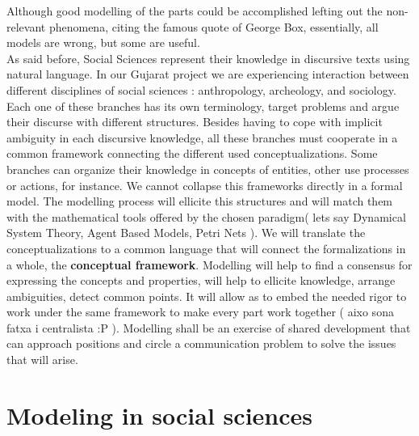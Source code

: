 \documentclass{report}
\begin{document}


Although good modelling of the parts could be accomplished lefting out the non-relevant phenomena, citing the famous quote of George Box, essentially, all models are wrong, but some are useful.\\

As said before, Social Sciences represent their knowledge in discursive texts using natural language. In our Gujarat project we are experiencing interaction between different disciplines of social sciences : anthropology, archeology, and sociology. Each one of these branches has its own terminology, target problems and argue their discurse with different structures. 
Besides having to cope with implicit ambiguity in each discursive knowledge, all these branches must cooperate in a common framework connecting the different used conceptualizations. Some branches can organize their knowledge in concepts of entities, other use processes or actions, for instance. We cannot collapse this frameworks directly in a formal model. The modelling process will ellicite this structures and will match them with the mathematical tools offered by the chosen paradigm( lets say Dynamical System Theory, Agent Based Models, Petri Nets ). We will translate the conceptualizations to a common language that will connect the formalizations in a whole, the \textbf{conceptual framework}.  
Modelling will help to find a consensus for expressing the concepts and properties, will help to ellicite knowledge, arrange ambiguities, detect common points. It will allow as to embed the needed rigor to work under the same framework to make every part work together ( aixo sona fatxa i centralista :P ). Modelling shall be an exercise of shared development that can approach positions and circle a communication problem to solve the issues that will arise.





\section{Modeling in social sciences}
\label{sec:modelsinSC}
\end{document}
